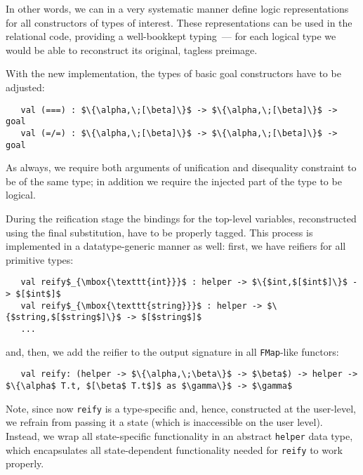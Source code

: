 In other words, we can in a very systematic manner define logic representations for all constructors
of types of interest. These representations can be used in the relational code, providing a well-bookkept
typing~--- for each logical type we would be able to reconstruct its original, tagless preimage.

With the new implementation, the types of basic goal constructors have to be adjusted:

\begin{lstlisting}
   val (===) : $\{\alpha,\;[\beta]\}$ -> $\{\alpha,\;[\beta]\}$ -> goal
   val (=/=) : $\{\alpha,\;[\beta]\}$ -> $\{\alpha,\;[\beta]\}$ -> goal
\end{lstlisting}

As always, we require both arguments of unification and disequality constraint to be of the same type; in addition
we require the injected part of the type to be logical.

During the reification stage the bindings for the top-level variables, reconstructed using the final
substitution, have to be properly tagged. This process is implemented in a datatype-generic manner as well:
first, we have reifiers for all primitive types:

\begin{lstlisting}
   val reify$_{\mbox{\texttt{int}}}$ : helper -> $\{$int,$[$int$]\}$ -> $[$int$]$
   val reify$_{\mbox{\texttt{string}}}$ : helper -> $\{$string,$[$string$]\}$ -> $[$string$]$
   ...
\end{lstlisting}

and, then, we add the reifier to the output signature in all \lstinline|FMap|-like functors:

\begin{lstlisting}
   val reify: (helper -> $\{\alpha,\;\beta\}$ -> $\beta$) -> helper -> $\{\alpha$ T.t, $[\beta$ T.t$]$ as $\gamma\}$ -> $\gamma$
\end{lstlisting}

Note, since now \lstinline|reify| is a type-specific and, hence, constructed at the user-level, we refrain from passing
it a state (which is inaccessible on the user level). Instead, we wrap all state-specific functionality in
an abstract \lstinline|helper| data type, which encapsulates all state-dependent functionality needed for \lstinline|reify|
to work properly.
